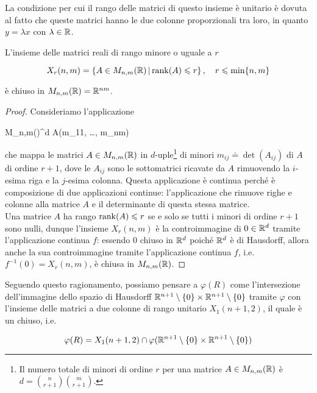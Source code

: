 La condizione per cui il rango delle matrici di questo insieme è unitario è dovuta al fatto che queste matrici hanno le due colonne proporzionali tra loro, in quanto $ y= \lambda x $ con $ \lambda \in \mathbb{R} $.

\begin{lemma}\label{lemma:clos-matrix}
	L'insieme delle matrici reali di rango minore o uguale a $ r $
	
	\begin{equation}
		X_{r}(n,m) = \left\{ A \in M_{n,m}(\R) \st \rank(A) \leqslant r \right\} %
		\qcomma r \leqslant \min\{n,m\}
	\end{equation}

	è chiuso in $ M_{n,m}(\mathbb{R}) = \mathbb{R}^{n m} $.
\end{lemma}

\begin{proof}
	Consideriamo l'applicazione
	
		{M_{n,m}(\R)}{\R^{d}}
		{A}{(m_{11}, \dots, m_{nm})}

	che mappa le matrici $ A \in M_{n,m}(\mathbb{R}) $ in $ d $-uple\footnote{%
		Il numero totale di minori di ordine $ r $ per una matrice $ A \in M_{n,m}(\mathbb{R}) $ è $ d = \binom{n}{r+1} \binom{m}{r+1} $.%
	} di minori $ m_{ij} \doteq \det(A_{ij}) $ di $ A $ di ordine $ r + 1 $, dove le $ A_{ij} $ sono le sottomatrici ricavate da $ A $ rimuovendo la $ i $-esima riga e la $ j $-esima colonna. Questa applicazione è continua perché è composizione di due applicazioni continue: l'applicazione che rimuove righe e colonne alla matrice $ A $ e il determinante di questa stessa matrice. \\
	Una matrice $ A $ ha rango $ \rank(A) \leqslant r $ se e solo se tutti i minori di ordine $ r+1 $ sono nulli, dunque l'insieme $ X_{r}(n,m) $ è la controimmagine di $ 0 \in \mathbb{R}^{d} $ tramite l'applicazione continua $ f $: essendo $ 0 $ chiuso in $ \mathbb{R}^{d} $ poiché $ \mathbb{R}^{d} $ è di Hausdorff, allora anche la sua controimmagine tramite l'applicazione continua $ f $, i.e. $ f^{-1}(0) = X_{r}(n,m) $, è chiusa in $ M_{n,m}(\mathbb{R}) $.
\end{proof}

Seguendo questo ragionamento, possiamo pensare a $ \varphi(R) $ come l'intersezione dell'immagine dello spazio di Hausdorff $ \mathbb{R}^{n+1} \setminus \{0\} \times \mathbb{R}^{n+1} \setminus \{0\} $ tramite $ \varphi $ con l'insieme delle matrici a due colonne di rango unitario $ X_{1}(n+1,2) $, il quale è un chiuso, i.e.

\begin{equation}
	\varphi(R) = X_{1}(n+1,2) \cap \varphi(\mathbb{R}^{n+1} \setminus \{0\} \times \mathbb{R}^{n+1} \setminus \{0\})
\end{equation}

